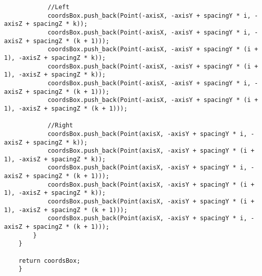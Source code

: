 \begin{lstlisting}
            //Left
            coordsBox.push_back(Point(-axisX, -axisY + spacingY * i, -axisZ + spacingZ * k));
            coordsBox.push_back(Point(-axisX, -axisY + spacingY * i, -axisZ + spacingZ * (k + 1)));
            coordsBox.push_back(Point(-axisX, -axisY + spacingY * (i + 1), -axisZ + spacingZ * k));
            coordsBox.push_back(Point(-axisX, -axisY + spacingY * (i + 1), -axisZ + spacingZ * k));
            coordsBox.push_back(Point(-axisX, -axisY + spacingY * i, -axisZ + spacingZ * (k + 1)));
            coordsBox.push_back(Point(-axisX, -axisY + spacingY * (i + 1), -axisZ + spacingZ * (k + 1)));

            //Right
            coordsBox.push_back(Point(axisX, -axisY + spacingY * i, -axisZ + spacingZ * k));
            coordsBox.push_back(Point(axisX, -axisY + spacingY * (i + 1), -axisZ + spacingZ * k));
            coordsBox.push_back(Point(axisX, -axisY + spacingY * i, -axisZ + spacingZ * (k + 1)));
            coordsBox.push_back(Point(axisX, -axisY + spacingY * (i + 1), -axisZ + spacingZ * k));
            coordsBox.push_back(Point(axisX, -axisY + spacingY * (i + 1), -axisZ + spacingZ * (k + 1)));
            coordsBox.push_back(Point(axisX, -axisY + spacingY * i, -axisZ + spacingZ * (k + 1)));
        }
    }

    return coordsBox;
    }
\end{lstlisting}
